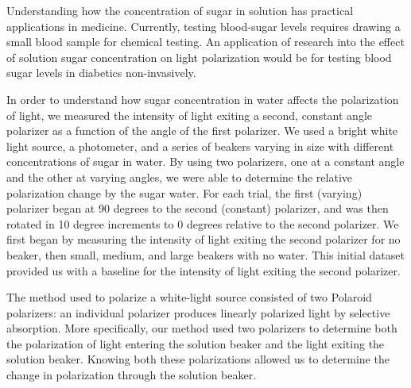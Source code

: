

Understanding how the concentration of sugar in solution has practical applications in medicine. Currently, testing blood-sugar levels requires drawing a small blood sample for chemical testing. An application of research into the effect of solution sugar concentration on light polarization would be for testing blood sugar levels in diabetics non-invasively.


In order to understand how sugar concentration in water affects the polarization of light, we measured the intensity of light exiting a second, constant angle polarizer as a function of the angle of the first polarizer. We used a bright white light source, a photometer, and a series of beakers varying in size with different concentrations of sugar in water. By using two polarizers, one at a constant angle and the other at varying angles, we were able to determine the relative polarization change by the sugar water. For each trial, the first (varying) polarizer began at 90 degrees to the second (constant) polarizer, and was then rotated in 10 degree increments to 0 degrees relative to the second polarizer. We first began by measuring the intensity of light exiting the second polarizer for no beaker, then small, medium, and large beakers with no water. This initial dataset provided us with a baseline for the intensity of light exiting the second polarizer.


The method used to polarize a white-light source consisted of two Polaroid polarizers: an individual polarizer produces linearly polarized light by selective absorption. More specifically, our method used two polarizers to determine both the polarization of light entering the solution beaker and the light exiting the solution beaker. Knowing both these polarizations allowed us to determine the change in polarization through the solution beaker.